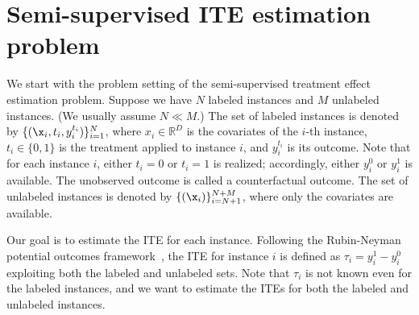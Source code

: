 
\section{Semi-supervised ITE estimation problem\label{sec:problem}}
We start with the problem setting of the semi-supervised treatment effect estimation problem. 
Suppose we have $N$ labeled instances and $M$ unlabeled instances. (We usually assume $N \ll M$.)
The set of labeled instances is denoted by $\{(\x_i, t_i, y^{t_i}_i)\}_{i=1}^{N}$, where $x_i \in \mathbb{R}^D$ is the covariates of the $i$-th instance, $t_i \in \{0,1\}$ is the treatment applied to instance $i$, and $y^{t_i}_i$ is its outcome.
Note that for each instance $i$, either  
$t_i=0$ or $t_i=1$ is realized; accordingly, either $y^{0}_i$ or $y^{1}_i$ is available. The unobserved outcome is called a counterfactual outcome.
%
The set of unlabeled instances is denoted by $\{(\x_i)\}_{i=N+1}^{N+M}$, where only the covariates are available.

Our goal is to estimate the ITE for each instance.
Following the Rubin-Neyman potential outcomes framework~\cite{rubin1974estimating,splawa1990application}, the ITE for instance $i$ is defined as   $\tau_i=y^1_{i}-y^0_{i}$
exploiting both the labeled and unlabeled sets. 
Note that $\tau_i$ is not known even for the labeled instances, and we want to estimate the ITEs for both the labeled and unlabeled instances.



